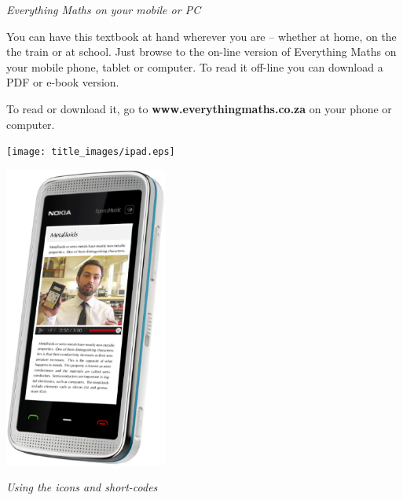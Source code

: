 \newpage
\thispagestyle{empty}

{\normalfont\sffamily\fontsize{22}\normalfont\itshape Everything Maths on your mobile or PC} \par

{\Large
You can have this textbook at hand wherever you are – whether at home, on the the train or at school.
Just browse to the on-line version of Everything Maths on your mobile phone, tablet or computer. To
read it off-line you can download a PDF or e-book version.\par


To read or download it, go to \textbf{www.everythingmaths.co.za} on your phone or computer.} \vspace*{2cm}


\begin{center}
\begin{minipage}{0.4\textwidth}
\centering
\texttt{[image: title\_images/ipad.eps]}
\end{minipage}
\begin{minipage}{0.4\textwidth}
\centering
\includegraphics[width=0.4\textwidth]{title_images/phone.eps}
\end{minipage}
\end{center}

\vspace*{2cm}


{\normalfont\sffamily\fontsize{22}\normalfont\itshape Using the icons and short-codes} \par

